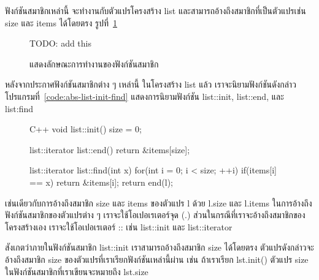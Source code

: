 ฟังก์ชัน{\wbr}สมาชิก{\wbr}เหล่านี้ จะ{\wbr}ทำงาน{\wbr}กับ{\wbr}ตัวแปร{\wbr}โครงสร้าง {\ct list}
และ{\wbr}สามารถ{\wbr}อ้าง{\wbr}ถึง{\wbr}สมาชิก{\wbr}ที่{\wbr}เป็น{\wbr}ตัวแปร{\wbr}เช่น {\ct size} และ {\ct items} ได้{\wbr}โดย{\wbr}ตรง{\wbr}
รูป{\wbr}ที่~\ref{fig:abs-member-functions}

\begin{figure}
TODO: add this
\caption{แสดง{\wbr}ลักษณะ{\wbr}การ{\wbr}ทำงาน{\wbr}ของ{\wbr}ฟังก์ชัน{\wbr}สมาชิก}
\label{fig:abs-member-functions}
\end{figure}

หลังจาก{\wbr}ประกาศ{\wbr}ฟังก์ชัน{\wbr}สมาชิก{\wbr}ต่าง ๆ เหล่านี้ ใน{\wbr}โครงสร้าง {\ct list} แล้ว{\wbr}
เรา{\wbr}จะ{\wbr}นิยาม{\wbr}ฟังก์ชัน{\wbr}ดังกล่าว โปรแกรม{\wbr}ที่~\ref{code:abs-list-init-find}
แสดง{\wbr}การ{\wbr}นิยาม{\wbr}ฟังก์ชัน {\ct list::init}, {\ct list::end}, และ {\ct list:find}

\begin{figure}
\latintext
\begin{codelist}{C++}{}
void list::init()
{
  size = 0;
}

list::iterator list::end()
{
  return &items[size];
}

list::iterator list::find(int x)
{
  for(int i = 0; i < size; ++i)
    if(items[i] == x)
      return &items[i];
  return end(l);
}
\end{codelist}
\thaitext
\end{figure}

เช่นเดียวกับ{\wbr}การ{\wbr}อ้าง{\wbr}ถึง{\wbr}สมาชิก {\ct size} และ {\ct items} ของ{\wbr}ตัวแปร {\ct l} ด้วย{\wbr}
{\ct l.size} และ {\ct l.items} ใน{\wbr}การ{\wbr}อ้าง{\wbr}ถึง{\wbr}ฟังก์ชัน{\wbr}สมาชิก{\wbr}ของ{\wbr}ตัวแปร{\wbr}ต่าง ๆ
เรา{\wbr}จะ{\wbr}ใช้{\wbr}โอ{\wbr}เปอเรเตอร์{\wbr}จุด ({\ct .})  ส่วน{\wbr}ใน{\wbr}กรณี{\wbr}ที่{\wbr}เรา{\wbr}จะ{\wbr}อ้าง{\wbr}ถึง{\wbr}สมาชิก{\wbr}ของ{\wbr}โครงสร้าง{\wbr}เอง{\wbr}
เรา{\wbr}จะ{\wbr}ใช้{\wbr}โอ{\wbr}เปอเรเตอร์ {\ct ::} เช่น {\ct list::init} และ {\ct
  list::iterator}

สังเกต{\wbr}ว่า{\wbr}ภายใน{\wbr}ฟังก์ชัน{\wbr}สมาชิก {\ct list::init} เรา{\wbr}สามารถ{\wbr}อ้าง{\wbr}ถึง{\wbr}สมาชิก {\ct size}
ได้{\wbr}โดย{\wbr}ตรง ตัวแปร{\wbr}ดังกล่าว{\wbr}จะ{\wbr}อ้าง{\wbr}ถึง{\wbr}สมาชิก {\ct size}
ของ{\wbr}ตัวแปร{\wbr}ที่{\wbr}เรา{\wbr}เรียก{\wbr}ฟังก์ชัน{\wbr}เหล่านี้{\wbr}ผ่าน เช่น ถ้า{\wbr}เรา{\wbr}เรียก {\ct lst.init()} ตัวแปร{\wbr}
{\ct size} ใน{\wbr}ฟังก์ชัน{\wbr}สมาชิก{\wbr}ที่{\wbr}เรา{\wbr}เขียน{\wbr}จะ{\wbr}หมายถึง {\ct lst.size}

